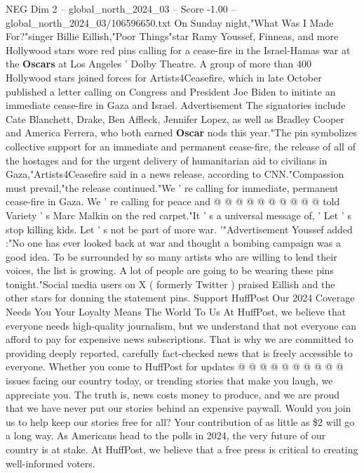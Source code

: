 \begin{textsample}{NEG Dim 2 – global\_north\_2024\_03 – Score -1.00 – global\_north\_2024\_03/106596650.txt}  \label{ex:f2_neg_076}
On Sunday night,"What Was I Made For?"singer Billie Eillish,"Poor Things"star Ramy Youssef, Finneas, and more Hollywood stars wore red pins calling for a cease-fire in the Israel-Hamas war at the \textbf{Oscars} at Los Angeles ' Dolby Theatre.
A group of more than 400 Hollywood stars joined forces for Artists4Ceasefire, which in late October published a letter calling on Congress and President Joe Biden to initiate an immediate cease-fire in Gaza and Israel.
Advertisement The signatories include Cate Blanchett, Drake, Ben Affleck, Jennifer Lopez, as well as Bradley Cooper and America Ferrera, who both earned \textbf{Oscar} nods this year."The pin symbolizes collective support for an immediate and permanent cease-fire, the release of all of the hostages and for the urgent delivery of humanitarian aid to civilians in Gaza,"Artists4Ceasefire said in a news release, according to CNN."Compassion must prevail,"the release continued."We ' re calling for immediate, permanent cease-fire in Gaza.
We ' re calling for peace and @ @ @ @ @ @ @ @ @ @ told Variety ' s Marc Malkin on the red carpet."It ' s a universal message of, ' Let ' s stop killing kids.
Let ' s not be part of more war. '"Advertisement Youssef added :"No one has ever looked back at war and thought a bombing campaign was a good idea.
To be surrounded by so many artists who are willing to lend their voices, the list is growing.
A lot of people are going to be wearing these pins tonight."Social media users on X ( formerly Twitter ) praised Eillish and the other stars for donning the statement pins.
Support HuffPost Our 2024 Coverage Needs You Your Loyalty Means The World To Us At HuffPost, we believe that everyone needs high-quality journalism, but we understand that not everyone can afford to pay for expensive news subscriptions.
That is why we are committed to providing deeply reported, carefully fact-checked news that is freely accessible to everyone.
Whether you come to HuffPost for updates @ @ @ @ @ @ @ @ @ @ issues facing our country today, or trending stories that make you laugh, we appreciate you.
The truth is, news costs money to produce, and we are proud that we have never put our stories behind an expensive paywall.
Would you join us to help keep our stories free for all?
Your contribution of as little as \$2 will go a long way.
As Americans head to the polls in 2024, the very future of our country is at stake.
At HuffPost, we believe that a free press is critical to creating well-informed voters.

\end{textsample}
